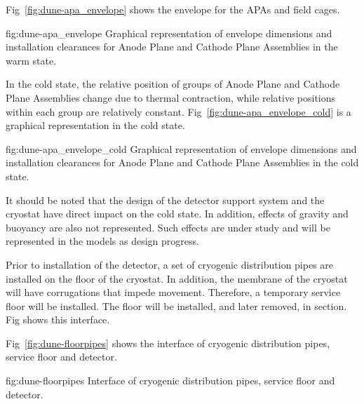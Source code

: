 Fig~\ref{fig:dune-apa_envelope} shows the envelope for the APAs and field cages.
\begin{dunefigure}{fig:dune-apa_envelope} {Graphical
    representation of envelope dimensions and installation clearances
    for Anode Plane and Cathode Plane Assemblies in the warm state.}
\end{dunefigure}


In the cold state, the relative position of groups of Anode Plane and
Cathode Plane Assemblies change due to thermal contraction, while
relative positions within each group are relatively
constant. Fig~\ref{fig:dune-apa_envelope_cold} is a graphical
representation in the cold state.
\begin{dunefigure}{fig:dune-apa_envelope_cold} {Graphical
    representation of envelope dimensions and installation clearances
    for Anode Plane and Cathode Plane Assemblies in the cold state.}
\end{dunefigure}

It should be noted that the design of the detector support system and
the cryostat have direct impact on the cold state. In addition,
effects of gravity and buoyancy are also not represented. Such effects
are under study and will be represented in the models as design
progress.

Prior to installation of the detector, a set of cryogenic distribution
pipes are installed on the floor of the cryostat. In addition, the
membrane of the cryostat will have corrugations that impede
movement. Therefore, a temporary service floor will be installed. The
floor will be installed, and later removed, in section. Fig shows this
interface.

Fig~\ref{fig:dune-floorpipes} shows the interface of cryogenic
distribution pipes, service floor and detector.
\begin{dunefigure}{fig:dune-floorpipes} {Interface of cryogenic distribution pipes, service floor and detector.}
\end{dunefigure}


